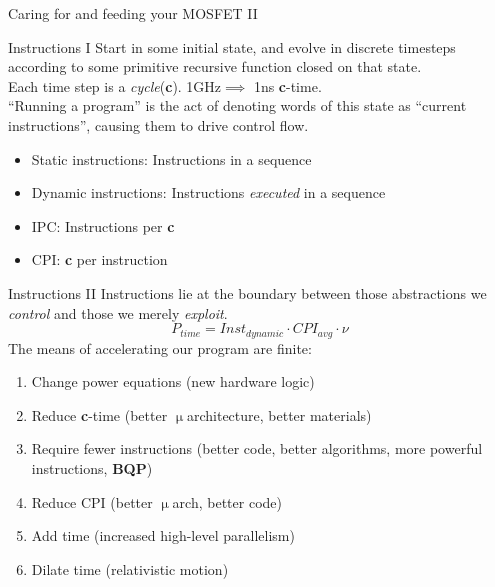 \documentclass[mathserif,xcolor={dvipsnames,table}]{beamer}
\begin{document}
\begin{frame}{Caring for and feeding your MOSFET II}
\lipsum[1]
\end{frame}

\begin{frame}{Instructions I}
Start in some initial state, and evolve in discrete timesteps
according to some primitive recursive function closed on that state.\\
\vspace{.25in}
Each time step is a \textit{cycle}(\textbf{c}). 1GHz$\implies$ 1ns \textbf{c}-time.\\
\vspace{.25in}
``Running a program'' is the act of denoting words of this state
as ``current instructions'', causing them to drive control flow.
\vspace{.25in}
\begin{itemize}
\item Static instructions: Instructions in a sequence
\item Dynamic instructions: Instructions \textit{executed} in a sequence
\item IPC: Instructions per \textbf{c}
\item CPI: \textbf{c} per instruction
\end{itemize}
\end{frame}

\begin{frame}{Instructions II}
Instructions lie at the boundary between those abstractions we \textit{control} and those
we merely \textit{exploit}.
\begin{equation}
P_{time} = Inst_{dynamic}\cdot CPI_{avg}\cdot\nu
\end{equation}
The means of accelerating our program are finite:
\begin{enumerate}
\item Change power equations (new hardware logic)
\item Reduce \textbf{c}-time (better $\upmu$architecture, better materials)
\item Require fewer instructions (better code, better algorithms, more powerful instructions, \textbf{BQP})
\item Reduce CPI (better $\upmu$arch, better code)
\item Add time (increased high-level parallelism)
\item Dilate time (relativistic motion)
\end{enumerate}
\end{frame}
\end{document}
